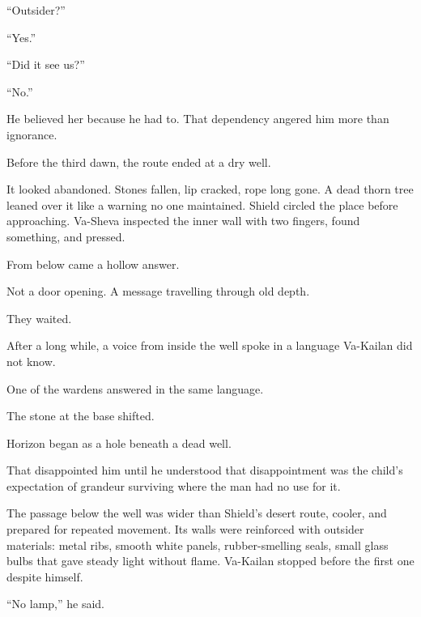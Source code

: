 “Outsider?”\par

“Yes.”\par

“Did it see us?”\par

“No.”\par

He believed her because he had to. That dependency angered him more than ignorance.\par

Before the third dawn, the route ended at a dry well.\par

It looked abandoned. Stones fallen, lip cracked, rope long gone. A dead thorn tree leaned over it like a warning no one maintained. Shield circled the place before approaching. Va-Sheva inspected the inner wall with two fingers, found something, and pressed.\par

From below came a hollow answer.\par

Not a door opening. A message travelling through old depth.\par

They waited.\par

After a long while, a voice from inside the well spoke in a language Va-Kailan did not know.\par

One of the wardens answered in the same language.\par

The stone at the base shifted.\par

Horizon began as a hole beneath a dead well.\par

That disappointed him until he understood that disappointment was the child’s expectation of grandeur surviving where the man had no use for it.\par

The passage below the well was wider than Shield’s desert route, cooler, and prepared for repeated movement. Its walls were reinforced with outsider materials: metal ribs, smooth white panels, rubber-smelling seals, small glass bulbs that gave steady light without flame. Va-Kailan stopped before the first one despite himself.\par

“No lamp,” he said.\par

